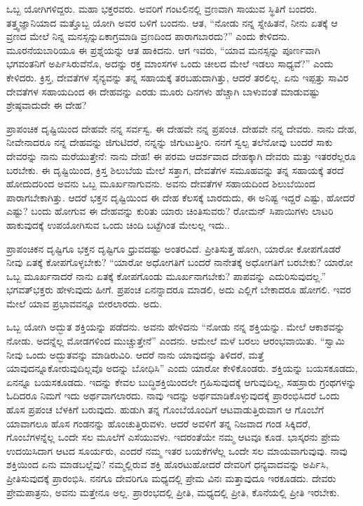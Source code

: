 ಒಬ್ಬ ಯೋಗಿಗಳಿದ್ದರು. ಮಹಾ ಭಕ್ತರವರು. ಅವರಿಗೆ ಗಂಟಲಿನಲ್ಲಿ ವ್ರಣವಾಗಿ ಸಾಯುವ ಸ್ಥಿತಿಗೆ ಬಂದರು. ತತ್ತ್ವಜ್ಞಾನಿಯಾದ ಮತ್ತೊಬ್ಬ ಯೋಗಿ ಅವರ ಬಳಿಗೆ ಬಂದನು. ಆತ, “ನೋಡು ನನ್ನ ಸ್ನೇಹಿತನೆ, ನೀನು ಏತಕ್ಕೆ ಆ ವ್ರಣದ ಮೇಲೆ ನಿನ್ನ ಮನಸ್ಸನ್ನು\break ಏಕಾಗ್ರಮಾಡಿ ವ್ರಣದಿಂದ ಪಾರಾಗಬಾರದು?” ಎಂದು ಕೇಳಿದನು. ಮೂರನೆಯ\break ಬಾರಿಯೂ ಈ ಪ್ರಶ್ನೆಯನ್ನು ಆತ ಹಾಕಿದನು. ಆಗ ಇವರು, “ಯಾವ ಮನಸ್ಸನ್ನು ಪೂರ್ಣವಾಗಿ ಭಗವಂತನಿಗೆ ಅರ್ಪಿಸಿರುವೆನೊ, ಅದನ್ನು ರಕ್ತ ಮಾಂಸಗಳ ಒಂದು ಚೀಲದ ಮೇಲೆ ಇಡಲು ಸಾಧ್ಯವೆ?” ಎಂದು ಕೇಳಿದರು. ಕ್ರಿಸ್ತ, ದೇವತೆಗಳ ಸೈನ್ಯವನ್ನು ತನ್ನ ಸಹಾಯಕ್ಕೆ ತರಬಹುದಾಗಿತ್ತು, ಆದರೆ ತರಲಿಲ್ಲ. ಏನು ಇಪ್ಪತ್ತು ಸಾವಿರ ದೇವತೆಗಳ ಸಹಾಯದಿಂದ ಈ ದೇಹವನ್ನು ಎರಡು ಮೂರು ದಿನಗಳು ಹೆಚ್ಚಾಗಿ ಬಾಳುವಂತೆ ಮಾಡುವಷ್ಟು ಶ್ರೇಷ್ಠವಾದುದೇ ಈ ದೇಹ?

ಪ್ರಾಪಂಚಿಕ ದೃಷ್ಟಿಯಿಂದ ದೇಹವೇ ನನ್ನ ಸರ್ವಸ್ವ. ಈ ದೇಹವೇ ನನ್ನ ಪ್ರಪಂಚ. ದೇಹವೇ ನನ್ನ ದೇವರು. ನಾನು ದೇಹ, ನೀವೇನಾದರೂ ನನ್ನ ದೇಹವನ್ನು ಜಿಗುಟಿದರೆ, ನನ್ನನ್ನು ಜಿಗುಟುತ್ತೀರಿ. ನನಗೆ ಸ್ವಲ್ಪ ತಲೆನೋವು ಬಂದರೆ ಸಾಕು ದೇವರನ್ನು ನಾನು ಮರೆಯುತ್ತೇನೆ: ನಾನು ದೇಹ! ಈ ಪರಮ ಆದರ್ಶವಾದ ದೇಹಕ್ಕಾಗಿ ದೇವರು ಮತ್ತು ಇತರರೆಲ್ಲರೂ ಬರಬೇಕು. ಈ ದೃಷ್ಟಿಯಿಂದ, ಕ್ರಿಸ್ತ ಶಿಲುಬೆಯ ಮೇಲೆ ಸತ್ತಾಗ, ದೇವತೆಗಳ ಸಮೂಹವನ್ನು ತನ್ನ ಸಹಾಯಕ್ಕೆ ತರದೆ ಹೋದುದರಿಂದ ಅವನು ಒಬ್ಬ ಮೂರ್ಖನಾಗುವನು. ಅವನು ದೇವತೆಗಳ ಸಹಾಯದಿಂದ ಶಿಲುಬೆಯಿಂದ ಪಾರಾಗಬೇಕಾಗಿತ್ತು. ಆದರೆ ಭಕ್ತನ ದೃಷ್ಟಿಯಿಂದ ಈ ದೇಹ ಕೆಲಸಕ್ಕೆ ಬಾರದುದು, ಈ ಅನಿಷ್ಟ ಇದ್ದರೆ ಎಷ್ಟು, ಹೋದರೆ ಎಷ್ಟು? ಬಂದು ಹೋಗುವ ಈ ದೇಹವನ್ನು ಕುರಿತು ಯಾರು ಚಿಂತಿಸುವರು? ರೋಮನ್ ಸಿಪಾಯಿಗಳು ಲಾಟರಿ ಹಾಕುವುದಕ್ಕೆ ಉಪಯೋಗಿಸುವ ಒಂದು ಚಿಂದಿ ಬಟ್ಟೆಗಿಂತ ಮೇಲಲ್ಲ ಇದು..

ಪ್ರಾಪಂಚಿಕನ ದೃಷ್ಟಿಗೂ ಭಕ್ತನ ದೃಷ್ಟಿಗೂ ಧ್ರುವದಷ್ಟು ಅಂತರವಿದೆ. ಪ್ರೀತಿಸುತ್ತ ಹೋಗಿ, ಯಾರೋ ಕೋಪಗೊಡರೆ ನೀವು ಏತಕ್ಕೆ ಕೋಪಗೊಳ್ಳಬೇಕು? “ಯಾರೋ ಅಧೋಗತಿಗೆ ಬಂದರೆ ನಾನೇತಕ್ಕೆ ಅಧೋಗತಿಗೆ ಬರಬೇಕು? ಯಾರೋ ಒಬ್ಬ ಮೂರ್ಖನಾದರೆ ನಾನು ಏತಕ್ಕೆ ಕೋಪಗೊಂಡು ಮೂರ್ಖನಾಗಬೇಕು? ಪಾಪವನ್ನು ಎದುರಿಸುವುದಲ್ಲ.” ಭಗವತ್‌ಭಕ್ತರು ಹೇಳುವುದು ಹೀಗೆ. ಪ್ರಪಂಚ ಏನನ್ನಾದರೂ ಮಾಡಲಿ, ಅದು ಎಲ್ಲಿಗೆ ಬೇಕಾದರೂ ಹೋಗಲಿ. ಇವರ ಮೇಲೆ ಯಾವ ಪ್ರಭಾವವನ್ನೂ ಬೀರಲಾರದು. ಅದು.

ಒಬ್ಬ ಯೋಗಿ ಅದ್ಭುತ ಶಕ್ತಿಯನ್ನು ಪಡೆದನು. ಅವನು ಹೇಳಿದನು “ನೋಡು ನನ್ನ ಶಕ್ತಿಯನ್ನು. ಮೇಲೆ ಆಕಾಶವನ್ನು ನೋಡು. ಅದನ್ನೆಲ್ಲ ಮೋಡಗಳಿಂದ ಮುಚ್ಚುತ್ತೇನೆ'' ಎಂದನು. ಆಮೇಲೆ ಮಳೆ ಬರಲು ಆರಂಭವಾಯಿತು. “ಸ್ವಾಮಿ ನೀವು ಒಂದು ಅದ್ಭುತವನ್ನು ಮಾಡಿರುವಿರಿ. ಆದರೆ ನಾನು ಯಾವುದನ್ನು ತಿಳಿದರೆ, ಮತ್ತೆ ಯಾವುದನ್ನೂ\break ಕೋರುವುದಿಲ್ಲವೊ ಅದನ್ನು ಬೋಧಿಸಿ'' ಎಂದು ಯಾರೋ ಕೇಳಿಕೊಂಡರು. ಶಕ್ತಿಯನ್ನು ಬಯಸಕೂಡದು, ಏನನ್ನೂ ಬಯಸಕೂಡದು. ಇದನ್ನು ಕೇವಲ ಬುದ್ಧಿಶಕ್ತಿಯಿಂದಲೇ ಗ್ರಹಿಸುವುದಕ್ಕೆ ಆಗುವುದಿಲ್ಲ, ಸಹಸ್ರಾರು ಗ್ರಂಥಗಳನ್ನು ಓದಿದರೂ ನಿಮಗೆ ಇದು ಅರ್ಥವಾಗಲಾರದು. ನಾವು ಇದನ್ನು ಅರ್ಥಮಾಡಿಕೊಳ್ಳುವುದಕ್ಕೆ ಪ್ರಾರಂಭಿಸಿದರೆ ಒಂದು ಹೊಸ ಪ್ರಪಂಚ ಬೆಳಕಿಗೆ ಬರುವುದು. ಹುಡುಗಿ ತನ್ನ ಗೊಂಬೆಯೊಂದಿಗೆ ಆಟವಾಡುತ್ತಿರುವಾಗ ಆ ಗೊಂಬೆಗೆ ಯಾವಾಗಲೂ ಹೊಸ ಗಂಡನನ್ನು ಹೊಂಚುತ್ತಿರುವಳು. ಆದರೆ ಅವಳಿಗೆ ತನ್ನ ನಿಜವಾದ ಗಂಡ ಸಿಕ್ಕಿದರೆ, ಗೊಂಬೆಗಳನ್ನೆಲ್ಲ ಒಂದೇ ಸಲ ಮೂಲೆಗೆ ಎಸೆಯುವಳು. ಇದರಂತೆಯೇ ನಮ್ಮ ಆಟವೂ ಕೂಡ. ಭಾಸ್ಕರನು ಪ್ರೇಮ ಉದಯಿಸಿದಾಗ ಆಟದ ಸೂರ್ಯರು, ಎಂದರೆ ನಮ್ಮ ಇತರ ಬಯಕೆಗಳೆಲ್ಲ ಒಂದೇ ಸಲ ಮಾಯವಾಗುವುವು. ನಾವು ಶಕ್ತಿಯಿಂದ ಏನು ಮಾಡಬಲ್ಲೆವು? ನಮ್ಮಲ್ಲಿರುವ ಶಕ್ತಿ ಹೊರಟುಹೋದರೆ ದೇವರಿಗೆ ಧನ್ಯವಾದವನ್ನು ಅರ್ಪಿಸಿ, ಪ್ರೀತಿಸುವುದಕ್ಕೆ ಪ್ರಾರಂಭಿಸಿ. ನನಗೂ ದೇವರಿಗೂ ಮಧ್ಯದಲ್ಲಿ ಪ್ರೇಮ ವಿನಃ ಮತ್ತಾವುದೂ ಇರಕೂಡದು. ದೇವರು ಪ್ರೇಮಪಾತ್ರನು, ಅವನು ಮತ್ತೇನೂ ಅಲ್ಲ. ಪ್ರಾರಂಭದಲ್ಲಿ ಪ್ರೀತಿ, ಮಧ್ಯದಲ್ಲಿ ಪ್ರೀತಿ, ಕೊನೆಯಲ್ಲಿ ಪ್ರೀತಿ ಇರಬೇಕು.

